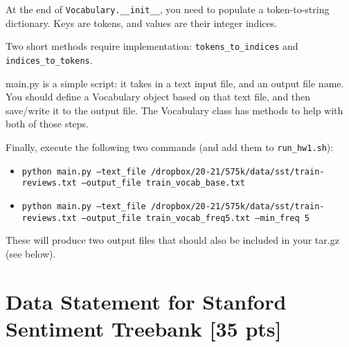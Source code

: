 \documentclass[11pt]{article}
\begin{document}
\vspace{2em}
  At the end of \texttt{Vocabulary.\_\_init\_\_}, you need to populate a token-to-string dictionary.  Keys are tokens, and values are their integer indices.

\vspace{2em}
  Two short methods require implementation: \texttt{tokens\_to\_indices} and \texttt{indices\_to\_tokens}.

\vspace{2em}
  main.py is a simple script: it takes in a text input file, and an output file name.  You should define a Vocabulary object based on that text file, and then save/write it to the output file.  The Vocabulary class has methods to help with both of those steps.

\vspace{2em}
  Finally, execute the following two commands (and add them to \texttt{run\_hw1.sh}):
\begin{itemize}
  \item \texttt{python main.py --text\_file /dropbox/20-21/575k/data/sst/train-reviews.txt --output\_file train\_vocab\_base.txt}
  \item \texttt{python main.py --text\_file /dropbox/20-21/575k/data/sst/train-reviews.txt --output\_file train\_vocab\_freq5.txt --min\_freq 5}
\end{itemize}
These will produce two output files that should also be included in your tar.gz (see below).


\section{Data Statement for Stanford Sentiment Treebank [35 pts]}
\end{document}
